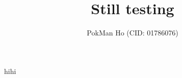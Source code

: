 \documentclass[a4paper, 11pt]{article}
\title{Still testing}
\author{PokMan Ho (CID: 01786076)}
\date{}
\begin{document}
	\maketitle
	hihi\autocite{zwietering1994modeling}
	
	\nocite{*}\printbibliography
\end{document}
